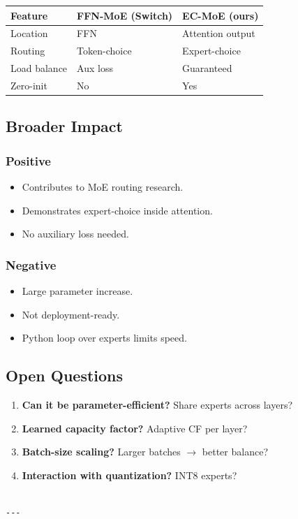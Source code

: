 \begin{table}[H]
\centering
\small
\begin{tabular}{lll}
\toprule
\textbf{Feature} & \textbf{FFN-MoE (Switch)} & \textbf{EC-MoE (ours)} \\
\midrule
Location & FFN & Attention output \\
Routing & Token-choice & Expert-choice \\
Load balance & Aux loss & Guaranteed \\
Zero-init & No & Yes \\
\bottomrule
\end{tabular}
\end{table}

\subsection{Broader Impact}

\subsubsection{Positive}
\begin{itemize}
\item Contributes to MoE routing research.
\item Demonstrates expert-choice inside attention.
\item No auxiliary loss needed.

\end{itemize}
\subsubsection{Negative}
\begin{itemize}
\item Large parameter increase.
\item Not deployment-ready.
\item Python loop over experts limits speed.

\end{itemize}
\subsection{Open Questions}

\begin{enumerate}
\item \textbf{Can it be parameter-efficient?} Share experts across layers?
\item \textbf{Learned capacity factor?} Adaptive CF per layer?
\item \textbf{Batch-size scaling?} Larger batches $\to$ better balance?
\item \textbf{Interaction with quantization?} INT8 experts?
\end{enumerate}
\begin{lstlisting}

---
\end{lstlisting}
